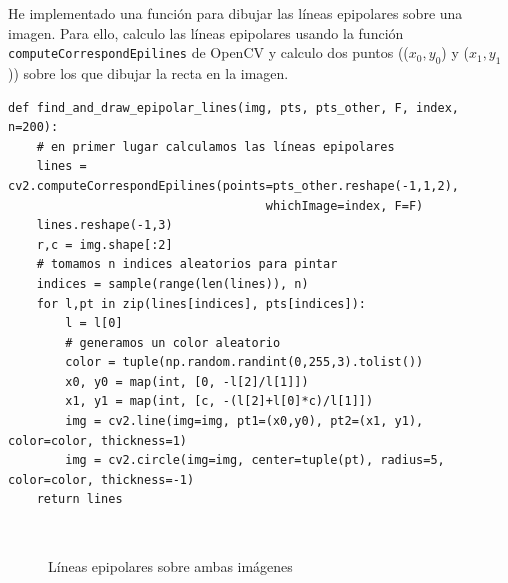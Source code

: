 \documentclass[11pt,a4paper]{article}
\theoremstyle{plain}
\theoremstyle{definition}
\begin{document}
He implementado una función para dibujar las líneas epipolares sobre una imagen. Para ello, calculo las líneas epipolares usando la función \texttt{computeCorrespondEpilines} de OpenCV y calculo dos puntos (($x_0, y_0$) y ($x_1, y_1$)) sobre los que dibujar la recta en la imagen.

\begin{verbatim}
def find_and_draw_epipolar_lines(img, pts, pts_other, F, index, n=200):
    # en primer lugar calculamos las líneas epipolares
    lines = cv2.computeCorrespondEpilines(points=pts_other.reshape(-1,1,2), 
                                    whichImage=index, F=F)
    lines.reshape(-1,3)
    r,c = img.shape[:2]
    # tomamos n indices aleatorios para pintar
    indices = sample(range(len(lines)), n)
    for l,pt in zip(lines[indices], pts[indices]):
        l = l[0]
        # generamos un color aleatorio
        color = tuple(np.random.randint(0,255,3).tolist())
        x0, y0 = map(int, [0, -l[2]/l[1]])
        x1, y1 = map(int, [c, -(l[2]+l[0]*c)/l[1]])
        img = cv2.line(img=img, pt1=(x0,y0), pt2=(x1, y1), color=color, thickness=1)
        img = cv2.circle(img=img, center=tuple(pt), radius=5, color=color, thickness=-1)
    return lines
\end{verbatim}

\begin{figure}[!h]
    \centering
    \mbox{
    }
    \caption{Líneas epipolares sobre ambas imágenes}
    \label{vmort}
\end{figure}
\end{document}
